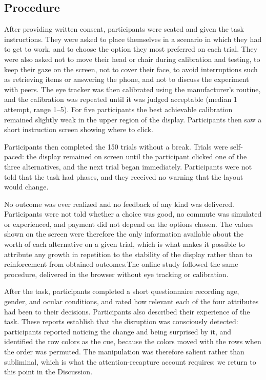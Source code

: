 \documentclass[man,natbib,floatsintext]{apa7}
\begin{document}
\subsection{Procedure}

After providing written consent, participants were seated and given the task instructions. They were asked to place themselves in a scenario in which they had to get to work, and to choose the option they most preferred on each trial. They were also asked not to move their head or chair during calibration and testing, to keep their gaze on the screen, not to cover their face, to avoid interruptions such as retrieving items or answering the phone, and not to discuss the experiment with peers. The eye tracker was then calibrated using the manufacturer's routine, and the calibration was repeated until it was judged acceptable (median 1 attempt, range 1--5). For five participants the best achievable calibration remained slightly weak in the upper region of the display. Participants then saw a short instruction screen showing where to click.

Participants then completed the 150 trials without a break. Trials were self-paced: the display remained on screen until the participant clicked one of the three alternatives, and the next trial began immediately. Participants were not told that the task had phases, and they received no warning that the layout would change.

No outcome was ever realized and no feedback of any kind was delivered. Participants were not told whether a choice was good, no commute was simulated or experienced, and payment did not depend on the options chosen. The values shown on the screen were therefore the only information available about the worth of each alternative on a given trial, which is what makes it possible to attribute any growth in repetition to the stability of the display rather than to reinforcement from obtained outcomes.The online study followed the same procedure, delivered in the browser without eye tracking or calibration. 

After the task, participants completed a short questionnaire recording age, gender, and ocular conditions, and rated how relevant each of the four attributes had been to their decisions. Participants also described their experience of the task. These reports establish that the disruption was consciously detected: participants reported noticing the change and being surprised by it, and identified the row colors as the cue, because the colors moved with the rows when the order was permuted. The manipulation was therefore salient rather than subliminal, which is what the attention-recapture account requires; we return to this point in the Discussion.
\end{document}
